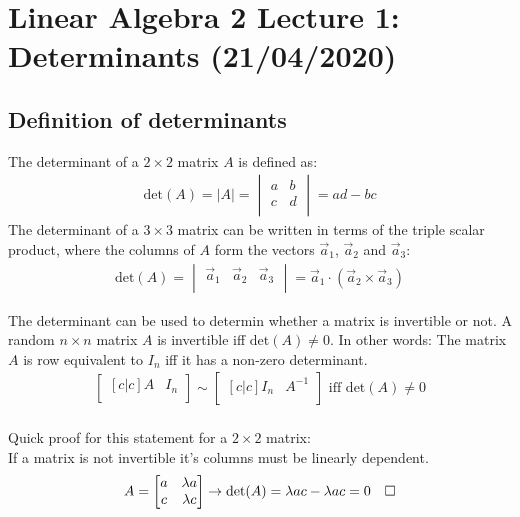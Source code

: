 \documentclass[11pt, a4paper]{article}
\newcommand*{\qed}{\hfill\ensuremath{\quad\square}}%
\begin{document}
\setcounter{section}{0}
\setcounter{equation}{0}
\section{Linear Algebra 2 Lecture 1: Determinants (21/04/2020)}


\subsection{Definition of determinants}
The determinant of a $2 \times 2$ matrix $A$ is defined as:
\begin{gather}
  \text{det}(A) = |A| = 
  \begin{vmatrix}
    a & b\\
    c & d\\
  \end{vmatrix}
  = ad - bc
\end{gather}
The determinant of a $3 \times 3$ matrix can be written in terms of the triple scalar product, where the columns of $A$ form the vectors $\vec{a}_1$, $\vec{a}_2$ and $\vec{a}_3$:
\begin{gather}
  \text{det}(A) = 
  \begin{vmatrix}
    \vec{a}_1 & \vec{a}_2 & \vec{a}_3\\ 
  \end{vmatrix}
  = \vec{a}_1 \cdot (\vec{a}_2 \times \vec{a}_3)
\end{gather} 

The determinant can be used to determin whether a matrix is invertible or not. A random $n \times n$ matrix $A$ is invertible iff $\text{det}(A) \neq 0$. In other words: The matrix $A$ is row equivalent to $I_n$ iff it has a non-zero determinant.
\begin{gather}
  \begin{bmatrix}[c|c]
    A & I_n\\
  \end{bmatrix}
  \sim
  \begin{bmatrix}[c|c]
    I_n & A^{-1}\\
  \end{bmatrix}
  \text{ iff } \text{det}(A) \neq 0
\end{gather}
\\
Quick proof for this statement for a $2 \times 2$ matrix:\\
If a matrix is not invertible it's columns must be linearly dependent.
\begin{gather}
  A = 
  \begin{bmatrix}
    a & \lambda a\\
    c & \lambda c\\
  \end{bmatrix}
  \rightarrow
  \text{det}(A) = \lambda ac - \lambda ac = 0 \qed
\end{gather}
\end{document}
